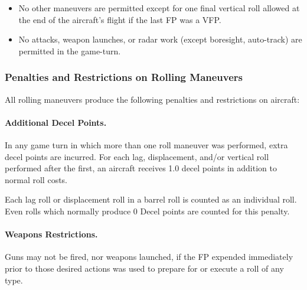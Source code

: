 \begin{itemize}



    \item No other maneuvers are permitted except for one final vertical roll allowed at the end of the aircraft's flight if the last FP was a VFP.

    \item No attacks, weapon launches, or radar work (except boresight, auto-track) are permitted in the game-turn.
    
\end{itemize}

\subsubsection{Penalties and Restrictions on Rolling Maneuvers}

All rolling maneuvers produce the following penalties and restrictions on aircraft:

\paragraph{Additional Decel Points.} In any game turn in which more than one roll maneuver was performed, extra decel points are incurred. For each lag, displacement, and/or vertical roll performed after the first, an aircraft receives 1.0 decel points in addition to normal roll costs.

Each lag roll or displacement roll in a barrel roll is counted as an individual roll. Even rolls which normally produce 0 Decel points are counted for this penalty.

\paragraph{Weapons Restrictions.} Guns may not be fired, nor weapons launched, if the FP expended immediately prior to those desired actions was used to prepare for or execute a roll of any type.

